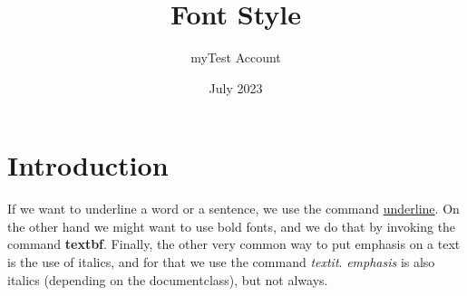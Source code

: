 \documentclass{article}
\title{Font Style}
\author{myTest Account}
\date{July 2023}
\begin{document}
\maketitle

\section{Introduction}

If we want to underline a word or a sentence, we use the command \underline{underline}. On the other hand we might want to use bold fonts, and we do that by invoking the command \textbf{textbf}. Finally, the other very common way to put emphasis on a text is the use of italics, and for that we use the command \textit{textit}. \emph{emphasis} is also italics (depending on the documentclass), but not always. 
\end{document}
